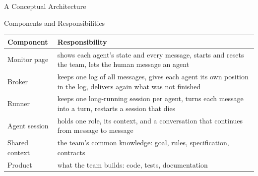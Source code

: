 \documentclass[aspectratio=169, table, 12pt]{beamer}
\begin{document}
\begin{frame}{{\Large A Conceptual Architecture}}
\end{frame}

\begin{frame}{{\Large Components and Responsibilities}}
  \vspace{4pt}
  \centering
  {\footnotesize
  \begin{tabularx}{\textwidth}{lY}
    \hline
    \textbf{Component} & \textbf{Responsibility} \\
    \hline
    Monitor page & shows each agent's state and every message, starts and resets the team, lets the human message an agent \\
    \hline
    Broker & keeps one log of all messages, gives each agent its own position in the log, delivers again what was not finished \\
    \hline
    Runner & keeps one long-running session per agent, turns each message into a turn, restarts a session that dies \\
    \hline
    Agent session & holds one role, its context, and a conversation that continues from message to message \\
    \hline
    Shared context & the team's common knowledge: goal, rules, specification, contracts \\
    \hline
    Product & what the team builds: code, tests, documentation \\
    \hline
  \end{tabularx}}
\end{frame}
\end{document}
